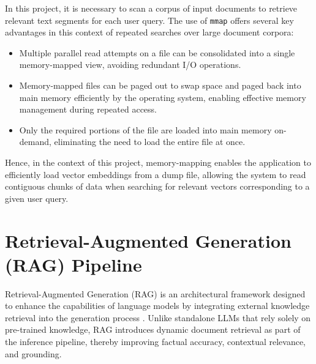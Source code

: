 In this project, it is necessary to scan a corpus of input documents to retrieve relevant text segments for each user query. The use of \texttt{mmap} offers several key advantages in this context of repeated searches over large document corpora:
\begin{itemize}
  \item Multiple parallel read attempts on a file can be consolidated into a single memory-mapped view, avoiding redundant I/O operations.
  \item Memory-mapped files can be paged out to swap space and paged back into main memory efficiently by the operating system, enabling effective memory management during repeated access.
  \item Only the required portions of the file are loaded into main memory on-demand, eliminating the need to load the entire file at once.
\end{itemize}

Hence, in the context of this project, memory-mapping enables the application to efficiently load vector embeddings from a dump file, allowing the system to read contiguous chunks of data when searching for relevant vectors corresponding to a given user query.

\section{Retrieval-Augmented Generation (RAG) Pipeline}
\label{sec:RAGPipeline}

Retrieval-Augmented Generation (RAG) is an architectural framework designed to enhance the capabilities of language models by integrating external knowledge retrieval into the generation process \cite{lewis2020rag}. Unlike standalone LLMs that rely solely on pre-trained knowledge, RAG introduces dynamic document retrieval as part of the inference pipeline, thereby improving factual accuracy, contextual relevance, and grounding.

